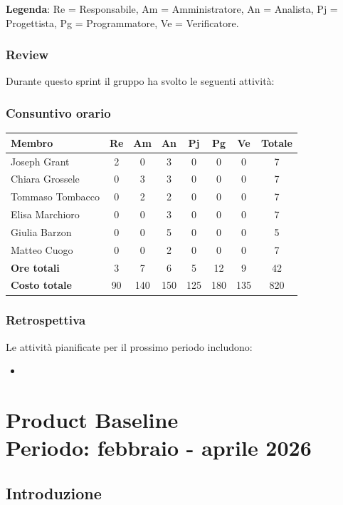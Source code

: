 \documentclass[11pt,a4paper]{article}
\begin{document}
\noindent \textbf{Legenda}: Re = Responsabile, Am = Amministratore, An = Analista, Pj = Progettista, Pg = Programmatore, Ve = Verificatore.

\subsubsection{Review}
Durante questo sprint il gruppo ha svolto le seguenti attività:


\subsubsection{Consuntivo orario}
\begin{center}
    \begin{tabular}{|l|c|c|c|c|c|c|c|}
        \hline
        \textbf{Membro} & \textbf{Re} & \textbf{Am} & \textbf{An} & \textbf{Pj} & \textbf{Pg} & \textbf{Ve} & \textbf{Totale} \\
        \hline
        Joseph Grant & 2 & 0 & 3 & 0 & 0 & 0 & 7 \\
        \hline
        Chiara Grossele & 0 & 3 & 3 & 0 & 0 & 0 & 7 \\
        \hline
        Tommaso Tombacco & 0 & 2 & 2 & 0 & 0 & 0 & 7 \\
        \hline
        Elisa Marchioro & 0 & 0 & 3 & 0 & 0 & 0 & 7 \\
        \hline
        Giulia Barzon & 0 & 0 & 5 & 0 & 0 & 0 & 5 \\
        \hline
        Matteo Cuogo & 0 & 0 & 2 & 0 & 0 & 0 & 7 \\
        \hline
        \textbf{Ore totali} & 3 & 7 & 6 & 5 & 12 & 9 & 42 \\
        \hline
        \textbf{Costo totale} & 90 & 140 & 150 & 125 & 180 & 135 & 820 \\
        \hline
    \end{tabular}
\end{center}

\subsubsection{Retrospettiva}
Le attività pianificate per il prossimo periodo includono:
\begin{itemize}
    \item 
\end{itemize}

\newpage



\newpage
\section{Product Baseline \\ \small\textbf{Periodo: febbraio - aprile 2026}}

\subsection{Introduzione}
\end{document}
